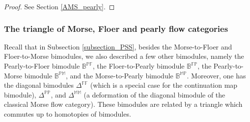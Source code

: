 \documentclass[reqno, 10pt]{amsart}
\numberwithin{equation}{section}
\numberwithin{equation}{section}
\theoremstyle{definition}
\theoremstyle{remark}
\newcommand{\mb}{\mathbb}
\begin{document}
\begin{proof}
See Section \ref{AMS_pearly}.
\end{proof}

\subsubsection{The triangle of Morse, Floer and pearly flow categories}


Recall that in Subsection \ref{subsection_PSS}, besides the Morse-to-Floer and Floer-to-Morse bimodules, we also described a few other bimodules, namely the Pearly-to-Floer bimodule $\mb{B}^{\mb{PF}}$, the Floer-to-Pearly bimodule ${\mb B}^{\mb{FP}}$, the Pearly-to-Morse bimodule ${\mb B}^{\mb{PM}}$, and the Morse-to-Pearly bimodule ${\mb B}^{\mb{MP}}$. Moreover, one has the diagonal bimodules $\mb{\Delta}^{\mb{FF}}$ (which is a special case for the continuation map bimodule), $\mb{\Delta}^{\mb{PP}}$, and $\mb{\Delta}^{\mb{MM}}$ (a deformation of the diagonal bimodule of the classical Morse flow category). These bimodules are related by a triangle which commutes up to homotopies of bimodules. 
\end{document}
